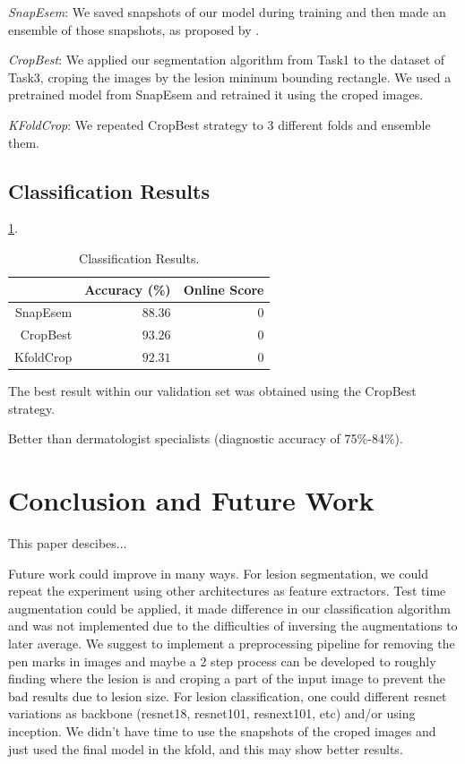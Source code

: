 \documentclass[conference]{IEEEtran}
\begin{document}
\emph{SnapEsem}: We saved snapshots of our model during training and then made an ensemble of those snapshots, as proposed by \cite{snapshots}.

\emph{CropBest}: We applied our segmentation algorithm from Task1 to the dataset of Task3, croping the images by the lesion mininum bounding rectangle. We used a pretrained model from SnapEsem and retrained it using the croped images.

\emph{KFoldCrop}: We repeated CropBest strategy to 3 different folds and ensemble them. 

\subsection{Classification Results}

\ref{tabela}.
\begin{table}[]
\centering
\caption{Classification Results.}
\label{tabela}
\begin{tabular}{@{}rrr@{}}
\toprule
            & \multicolumn{1}{c}{Accuracy (\%)} & \multicolumn{1}{c}{Online Score} \\ \midrule
SnapEsem & \(88.36\)& \(0\)                                  \\ \midrule
CropBest   & \(93.26\)&  \(0\)                                \\ \midrule
KfoldCrop    & \(92.31\)  & \(0\)                              \\ \bottomrule
\end{tabular}
\end{table}

The best result within our validation set was obtained using the CropBest strategy. 

Better than dermatologist specialists (diagnostic accuracy of 75\%-84\%).


\section{Conclusion and Future Work}

This paper descibes... 

Future work could improve in many ways. For lesion segmentation, we could repeat the experiment using other architectures as feature extractors. Test time augmentation could be applied, it made difference in our classification algorithm and was not implemented due to the difficulties of inversing the augmentations to later average.  We suggest to implement a preprocessing pipeline for removing the pen marks in images and maybe a 2 step process can be developed to roughly finding where the lesion is and croping a part of the input image to prevent the bad results due to lesion size. For lesion classification, one could different resnet variations as backbone (resnet18, resnet101, resnext101, etc) and/or using inception. We didn't have time to use the snapshots of the croped images and just used the final model in the kfold, and this may show better results.





\end{document}
